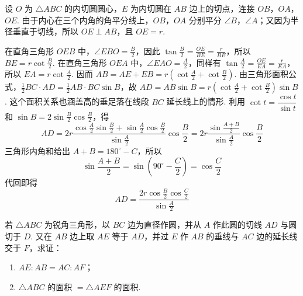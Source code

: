 \documentclass[UTF8,a4paper,oneside,11pt]{ctexbook}
\begin{document}
\begin{solution}
设 \(O\) 为 \(\triangle ABC\) 的内切圆圆心，\(E\) 为内切圆在 \(AB\) 边上的切点，连接 \(OB\)，\(OA\)，\(OE\). 由于内心在三个内角的角平分线上，\(OB\)，\(OA\) 分别平分 \(\angle B\)，\(\angle A\)；又因为半径垂直于切线，所以 \(OE\perp AB\)，且 \(OE=r\).

在直角三角形 \(OEB\) 中，\(\angle EBO=\frac{B}{2}\)，因此 \(\tan\frac{B}{2}=\frac{OE}{BE}=\frac{r}{BE}\)，所以 \(BE=r\cot\frac{B}{2}\).
在直角三角形 \(OEA\) 中，\(\angle EAO=\frac{A}{2}\)，同样有
\(\tan\frac{A}{2}=\frac{OE}{EA}=\frac{r}{EA}\)，所以 \(EA=r\cot\frac{A}{2}\). 因而 \(AB=AE+EB=r\left(\cot\frac{A}{2}+\cot\frac{B}{2}\right)\).
由三角形面积公式，\(\frac12BC\cdot AD=\frac12AB\cdot BC\sin B\)，故 \(AD=AB\sin B=r\left(\cot\frac{A}{2}+\cot\frac{B}{2}\right)\sin B\). 这个面积关系也涵盖高的垂足落在线段 \(BC\) 延长线上的情形.
利用 \(\cot t=\dfrac{\cos t}{\sin t}\) 和 \(\sin B=2\sin\frac{B}{2}\cos\frac{B}{2}\)，得
\[
AD=2r\frac{\cos\frac{A}{2}\sin\frac{B}{2}+\sin\frac{A}{2}\cos\frac{B}{2}}{\sin\frac{A}{2}}\cos\frac{B}{2}
=2r\frac{\sin\frac{A+B}{2}}{\sin\frac{A}{2}}\cos\frac{B}{2}
\]
三角形内角和给出 \(A+B=180^{\circ}-C\)，所以
\[
\sin\frac{A+B}{2}=\sin\left(90^{\circ}-\frac{C}{2}\right)=\cos\frac{C}{2}
\]
代回即得
\[
AD=\frac{2r\cos\frac{B}{2}\cos\frac{C}{2}}{\sin\frac{A}{2}}
\]

\end{solution}

\begin{problem}
若 \(\triangle ABC\) 为锐角三角形，以 \(BC\) 边为直径作圆，并从 \(A\) 作此圆的切线 \(AD\) 与圆切于 \(D\). 又在 \(AB\) 边上取 \(AE\) 等于 \(AD\)，并过 \(E\) 作 \(AB\) 的垂线与 \(AC\) 边的延长线交于 \(F\)，求证：

\begin{enumerate}
\item \(AE:AB=AC:AF\)；
\item \(\triangle ABC\) 的面积 \(=\triangle AEF\) 的面积.
\end{enumerate}
\end{problem}
\end{document}
